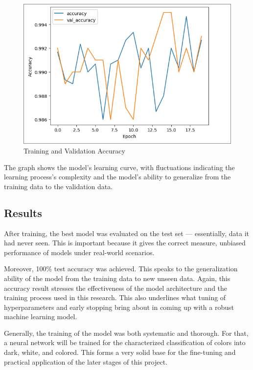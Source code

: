 \documentclass{article}
\begin{document}
\begin{figure}[H]
    \centering
    \includegraphics[width=\textwidth]{pictures/graph_1_training.png}
    \caption{Training and Validation Accuracy}
    \label{fig:accuracy_graph}
\end{figure}

The graph shows the model's learning curve, with fluctuations indicating the learning process's complexity and the model's ability to generalize from the training data to the validation data.

\subsection{Results}
After training, the best model was evaluated on the test set — essentially, data it had never seen. This is important because it gives the correct measure, unbiased performance of models under real-world scenarios.

Moreover, 100\% test accuracy was achieved. This speaks to the generalization ability of the model from the training data to new unseen data. Again, this accuracy result stresses the effectiveness of the model architecture and the training process used in this research. This also underlines what tuning of hyperparameters and early stopping bring about in coming up with a robust machine learning model.

Generally, the training of the model was both systematic and thorough. For that, a neural network will be trained for the characterized classification of colors into dark, white, and colored. This forms a very solid base for the fine-tuning and practical application of the later stages of this project.\newpage
\end{document}
